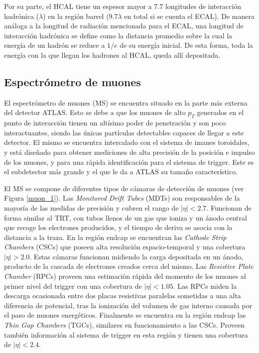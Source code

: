 Por su parte, el HCAL tiene un espesor mayor a 7.7 longitudes de interacción
hadrónica ($\lambda$) en la región barrel (9.7$\lambda$ en total si se cuenta el ECAL). De manera
análoga a la longitud de radiación mencionada para el ECAL, una longitud de
interacción hadrónica se define como la distancia promedio sobre la cual la energía
de un hadrón se reduce a $1/e$ de su energía inicial. De esta forma, toda la energía
con la que llegan los hadrones al HCAL, queda allí depositada.

\subsection{Espectrómetro de muones}


El espectrómetro de muones (MS) se encuentra situado en la parte más externa del detector ATLAS. Esto se debe a que los muones de alto $p_{T}$ generados en el punto de interacción tienen un altísimo poder de penetración y son poco interactuantes, siendo las únicas partículas detectables capaces de llegar a este detector. El mismo se encuentra intercalado con el sistema de imanes toroidales, y está diseñado para obtener mediciones de alta precisión de la posición e impulso de los muones, y para una rápida identificación para el sistema de trigger. Este es el subdetector más grande y el que le da a ATLAS su tamaño característico. 

El MS se compone de diferentes tipos de cámaras de detección de muones (ver Figura \ref{muon_1}). Las \textit{Monitored Drift Tubes} (MDTs) son responsables de la mayoría de las medidas de precisión y cubren el rango de $|\eta|<2.7$. Funcionan de forma similar al TRT, con tubos llenos de un gas que ioniza y un ánodo central que recoge los electrones producidos, y el tiempo de deriva se asocia con la distancia a la traza. En la región endcap se encuentran las \textit{Cathode Strip Chambers} (CSCs) que poseen alta resolución espacio-temporal y una cobertura $|\eta|>2.0$. Estas cámaras funcionan midiendo la carga depositada en un ánodo, producto de la cascada de electrones creados cerca del mismo. Las \textit{Resistive Plate Chamber} (RPCs) proveen una estimación rápida del momento de los muones al primer nivel del trigger con una cobertura de $|\eta|<1.05$. Las RPCs miden la descarga ocasionada entre dos placas resistivas paralelas sometidas a una alta diferencia de potencial, tras la ionización del volumen de gas interno causada por el paso de muones energéticos. Finalmente se encuentra en la región endcap las \textit{Thin Gap Chambers} (TGCs), similares en funcionamiento a las CSCs. Proveen también información al sistema de trigger en esta región y tienen una cobertura de $|\eta|<2.4$.

